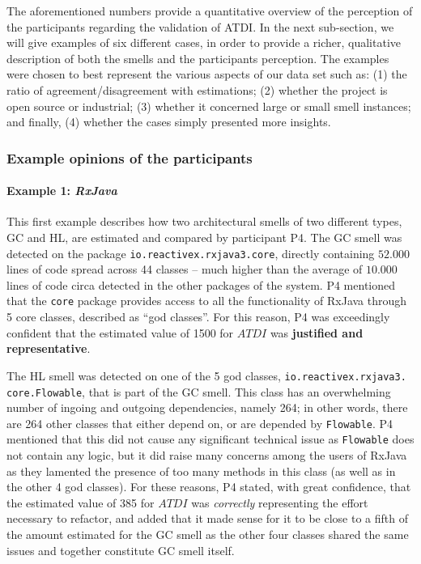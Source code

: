 The aforementioned numbers provide a quantitative overview of the perception of the participants regarding the validation of ATDI.
In the next sub-section, we will give examples of six different cases, in order to provide a richer, qualitative description of both the smells and the participants perception.  
The examples were chosen to best represent the various aspects of our data set such as: (1) the ratio of agreement/disagreement with estimations; (2) whether the project is open source or industrial; (3) whether it concerned large or small smell instances; and finally, (4) whether the  cases simply presented more insights.

\subsubsection{Example opinions of the participants}\label{c6:sec:examples}
\paragraph{Example 1: \emph{RxJava}} This first example describes how two architectural smells of two different types, GC and HL, are estimated and compared by participant P4.
The GC smell was detected on the package \texttt{io.reactivex.rxjava3.core}, directly containing $52.000$ lines of code spread across 44 classes -- much higher than the average of $10.000$ lines of code circa detected in the other packages of the system.
P4 mentioned that the \texttt{core} package provides access to all the functionality of RxJava through 5 core classes, described as ``god classes''.
For this reason, P4 was exceedingly confident that the estimated value of 1500 for $ATDI$ was \textbf{justified and representative}.

The HL smell was detected on one of the 5 god classes, \texttt{io.reactivex.rxjava3. core.Flowable}, that is part of the GC smell.
This class has an overwhelming number of ingoing and outgoing dependencies, namely 264; in other words, there are 264 other classes that either depend on, or are depended by \texttt{Flowable}.
P4 mentioned that this did not cause any significant technical issue as \texttt{Flowable} does not contain any logic, but it did raise many concerns among the users of RxJava as they lamented the presence of too many methods in this class (as well as in the other 4 god classes).
For these reasons, P4 stated, with great confidence, that the estimated value of 385 for $ATDI$ was \emph{correctly} representing the effort necessary to refactor, and added that it made sense for it to be close to a fifth of the amount estimated for the GC smell as the other four classes shared the same issues and together constitute GC smell itself.

